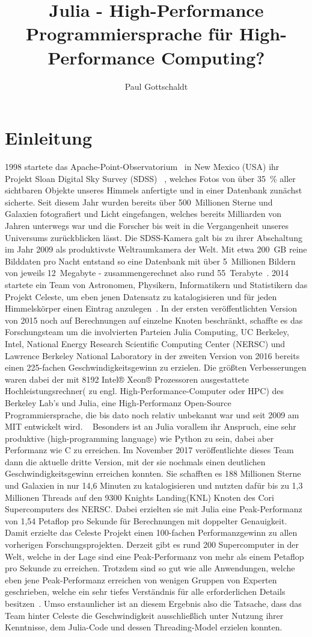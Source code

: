 \documentclass[proseminar,german,utf8]{zihpub}
\author{Paul Gottschaldt}
\title{Julia - High-Performance Programmiersprache für High-Performance Computing?}
\begin{document}
\section {Einleitung}
1998 startete das Apache-Point-Observatorium~\cite{APOWiki} in New Mexico (USA) ihr Projekt Sloan Digital Sky Survey (SDSS)~\cite{SDSSWiki} \cite{SDSSIII}, welches Fotos von über 35~\% aller sichtbaren Objekte unseres Himmels anfertigte und in einer Datenbank zunächst sicherte. Seit diesem Jahr wurden bereits über 500~Millionen Sterne und Galaxien fotografiert und Licht eingefangen, welches bereits Milliarden von Jahren unterwegs war und die Forscher bis weit in die Vergangenheit unseres Universums zurückblicken lässt. Die SDSS-Kamera galt bis zu ihrer Abschaltung im Jahr 2009 als produktivste Weltraumkamera der Welt. Mit etwa 200~GB reine Bilddaten pro Nacht entstand so eine Datenbank mit über 5~Millionen Bildern von jeweils 12~Megabyte - zusammengerechnet also rund 55~Terabyte~\cite{CelesteV2}. 2014 startete ein Team von Astronomen, Physikern, Informatikern und Statistikern das Projekt Celeste, um eben jenen Datensatz zu katalogisieren und für jeden Himmelskörper einen Eintrag anzulegen~\cite{CelesteV3}. In der ersten veröffentlichten Version von 2015 noch auf Berechnungen auf einzelne Knoten beschränkt, schaffte es das Forschungsteam um die involvierten Parteien Julia Computing, UC Berkeley, Intel, National Energy Research Scientific Computing Center (NERSC) und Lawrence Berkeley National Laboratory in der zweiten Version von 2016 bereits einen 225-fachen Geschwindigkeitsgewinn zu erzielen. Die größten Verbesserungen waren dabei der mit 8192 Intel® Xeon® Prozessoren ausgestattete Hochleistungsrechner( zu engl. High-Performance-Computer oder HPC) des Berkeley Lab's und Julia, eine High-Performanz Open-Source Programmiersprache, die bis dato noch relativ unbekannt war und seit 2009 am MIT entwickelt wird. ~\cite{CelesteHeise} \cite{CelesteVideo} Besonders ist an Julia vorallem ihr Anspruch, eine sehr produktive (high-programming language) wie Python zu sein, dabei aber Performanz wie C zu erreichen. Im November 2017 veröffentlichte dieses Team dann die aktuelle dritte Version, mit der sie nochmals einen deutlichen Geschwindigkeitsgewinn erreichen konnten. Sie schafften es 188 Millionen Sterne und Galaxien in nur 14,6 Minuten zu katalogisieren und nutzten dafür bis zu 1,3 Millionen Threads auf den 9300 Knights Landing(KNL) Knoten des Cori Supercomputers des NERSC. Dabei erzielten sie mit Julia eine Peak-Performanz von 1,54 Petaflop pro Sekunde für Berechnungen mit doppelter Genauigkeit. Damit erzielte das Celeste Projekt einen 100-fachen Performanzgewinn zu allen vorherigen Forschungsprojekten. Derzeit gibt es rund 200 Supercomputer in der Welt, welche in der Lage sind eine Peak-Performanz von mehr als einem Petaflop pro Sekunde zu erreichen. Trotzdem sind so gut wie alle Anwendungen, welche eben jene Peak-Performanz erreichen von wenigen Gruppen von Experten geschrieben, welche ein sehr tiefes Verständnis für alle erforderlichen Details besitzen~\cite{CelesteNextPlatform}. Umso erstaunlicher ist an diesem Ergebnis also die Tatsache, dass das Team hinter Celeste die Geschwindigkeit ausschließlich unter Nutzung ihrer Kenntnisse, dem Julia-Code und dessen Threading-Model erzielen konnten.
\end{document}
